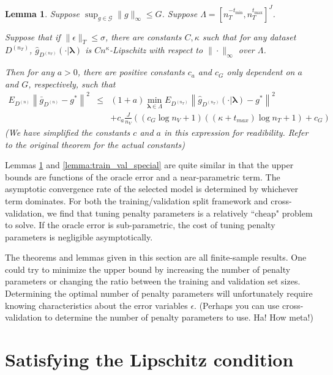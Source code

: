 \documentclass[12pt]{article}
\newtheorem{lemma}{Lemma}
\begin{document}
\begin{lemma}
	\label{lemma:kfold_special}
Suppose $\sup_{g \in \mathcal{G}} \|g\|_\infty \le G$. Suppose $\Lambda = [n_T^{-t_{\min}}, n_T^{t_{\max}}]^J$.

Suppose that if $\|\epsilon\|_{T}\le \sigma$, there are constants $C,\kappa$ such that for any dataset $D^{(n_T)}$, $\hat{g}_{D^{(n_T)}}(\cdot | \boldsymbol \lambda)$ is $Cn^\kappa$-Lipschitz with respect to $\| \cdot \|_\infty$ over $\Lambda$.

Then for any $a > 0$, there are positive constants $c_a$ and $c_G$ only dependent on $a$ and $G$, respectively, such that
\begin{eqnarray}
E_{D^{(n)}} \left \| \bar{g}_{D^{(n)}} - g^* \right \|^2 
&\le&
(1+a) \min_{\boldsymbol{\lambda} \in \Lambda}  E_{D^{(n_T)}} \left \| \hat{g}_{D^{(n_T)}}(\cdot |\boldsymbol \lambda) - g^* \right \|^2 \\
&& + c_a \frac{J}{n_{V}}\left( \left(c_{G}\log n_{V}+1\right)\left(\left(\kappa+t_{max}\right)\log n_{T}+1\right)+c_{G}\right )
\end{eqnarray}
(We have simplified the constants $c$ and $a$ in this expression for readibility. Refer to the original theorem for the actual constants)
\end{lemma}
Lemmas \ref{lemma:kfold_special} and \ref{lemma:train_val_special} are quite similar in that the upper bounds are functions of the oracle error and a near-parametric term. The asymptotic convergence rate of the selected model is determined by whichever term dominates. For both the training/validation split framework and cross-validation, we find that tuning penalty parameters is a relatively ``cheap" problem to solve. If the oracle error is sub-parametric, the cost of tuning penalty parameters is negligible asymptotically.

The theorems and lemmas given in this section are all  finite-sample results. One could try to minimize the upper bound by increasing the number of penalty parameters or changing the ratio between the training and validation set sizes. Determining the optimal number of penalty parameters will unfortunately require knowing characteristics about the error variables $\epsilon$. (Perhaps you can use cross-validation to determine the number of penalty parameters to use. Ha! How meta!)

\section{Satisfying the Lipschitz condition}
\label{sec:entropy}
\end{document}
